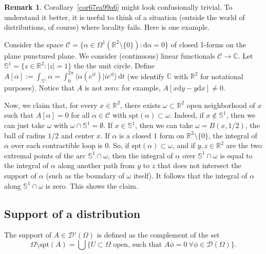 \documentclass[a4paper,9pt]{amsart}
\newcommand{\scr}[1]{\mathscr{#1}}
\newcommand{\bb}[1]{\mathbb{#1}}
\newcommand{\R}{\mathbb{R}}	%
\newcommand{\C}{\mathbb{C}}	%
\newcommand{\dd}{\mathrm{d}}	%
\newcommand{\did}{\,\mathrm{d}}	%
\newcommand{\spt}{\mathrm{spt}}
\theoremstyle{plain}
\theoremstyle{definition}
\newtheorem{remark}[proposition]{Remark}
\theoremstyle{remark}
\begin{document}
\begin{remark}
	Corollary~\ref{cor67ea99a6} might look confusionally trivial.
	To understand it better, it is useful to think of a situation (outside the world of distributions, of course) where locality fails.
	Here is one example.
	
	Consider the space $\scr C = \{\alpha\in\Omega^1(\R^2\setminus\{0\}) : \dd \alpha = 0 \}$ of closed 1-forms on the plane punctured plane.
	We consider (continuous) linear functionals $\scr C\to\C$.
	Let $\bb S^1 = \{z\in\R^2: |z|=1\}$ the the unit circle.
	Define $A[\alpha] := \int_{\bb S^1} \alpha = \int_0^{2\pi} \langle \alpha(e^{it}) | ie^{it} \rangle \did t$ 
	(we identify $\C$ with $\R^2$ for notational purposes).
	Notice that $A$ is not zero: for example, $A[x\dd y - y \dd x]\neq0$.
	
	Now, we claim that, for every $x\in\R^2$, there exists $\omega\subset\R^2$ open neighborhood of $x$ such that $A[\alpha]=0$ for all $\alpha\in\scr C$ with $\spt(\alpha)\subset\omega$.
	Indeed, if $x\notin\bb S^1$, then we can just take $\omega$ with $\omega\cap\bb S^1=\emptyset$.
	If $x\in\bb S^1$, then we can take $\omega = B(x,1/2)$, the ball of radius $1/2$ and center $x$.
	If $\alpha$ is a closed 1 form on $\R^2\setminus \{0\}$, the integral of $\alpha$ over each contractible loop is $0$.
	So, if $\spt(\alpha)\subset\omega$, and if $y,z\in\R^2$ are the two extremal points of the arc $\bb S^1\cap \omega$, then the integral of $\alpha$ over $\bb S^1\cap \omega$ is equal to the integral of $\alpha$ along another path from $y$ to $z$ that does not intersect the support of $\alpha$ (such as the boundary of $\omega$ itself).
	It follows that the integral of $\alpha$ along $\bb S^1\cap \omega$ is zero.
	This shows the claim.
\end{remark}

\subsection{Support of a distribution}\label{subs67e1bd60}
The support of $A\in\scr D'(\Omega)$ is defined as the complement of the set
\begin{equation}
	\Omega\setminus\spt(A) = \bigcup\{U\subset\Omega\text{ open, such that }A\phi=0\ \forall\phi\in\scr D(\Omega) \}.
\end{equation}
\end{document}
